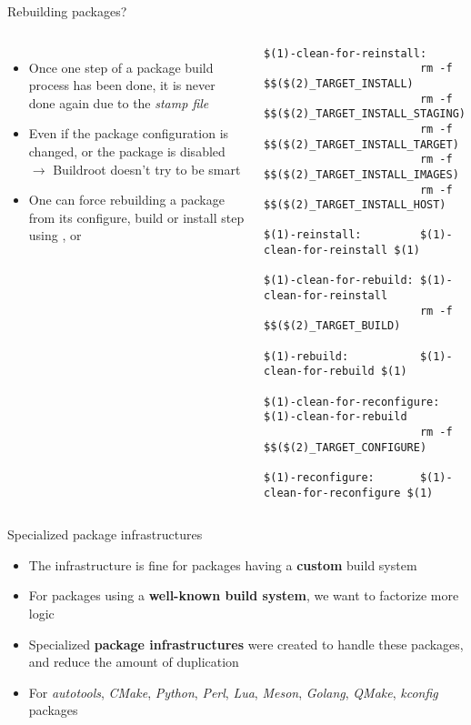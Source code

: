\begin{frame}[fragile]{Rebuilding packages?}
  \begin{columns}
  \begin{itemize}
  \item Once one step of a package build process has been done, it is
    never done again due to the {\em stamp file}
  \item Even if the package configuration is changed, or the package
    is disabled $\rightarrow$ Buildroot doesn't try to be smart
  \item One can force rebuilding a package from its configure, build
    or install step using ,
     or 
  \end{itemize}
  \begin{block}{}
\begin{verbatim}
$(1)-clean-for-reinstall:
                        rm -f $$($(2)_TARGET_INSTALL)
                        rm -f $$($(2)_TARGET_INSTALL_STAGING)
                        rm -f $$($(2)_TARGET_INSTALL_TARGET)
                        rm -f $$($(2)_TARGET_INSTALL_IMAGES)
                        rm -f $$($(2)_TARGET_INSTALL_HOST)

$(1)-reinstall:         $(1)-clean-for-reinstall $(1)

$(1)-clean-for-rebuild: $(1)-clean-for-reinstall
                        rm -f $$($(2)_TARGET_BUILD)

$(1)-rebuild:           $(1)-clean-for-rebuild $(1)

$(1)-clean-for-reconfigure: $(1)-clean-for-rebuild
                        rm -f $$($(2)_TARGET_CONFIGURE)

$(1)-reconfigure:       $(1)-clean-for-reconfigure $(1)
\end{verbatim}
  \end{block}
  \end{columns}
\end{frame}

\begin{frame}{Specialized package infrastructures}
  \begin{itemize}
  \item The  infrastructure is fine for packages
    having a {\bf custom} build system
  \item For packages using a {\bf well-known build system}, we want
    to factorize more logic
  \item Specialized {\bf package infrastructures} were created to
    handle these packages, and reduce the amount of duplication
  \item For {\em autotools}, {\em CMake}, {\em Python}, {\em Perl},
    {\em Lua}, {\em Meson}, {\em Golang}, {\em QMake}, {\em kconfig}
    packages
  \end{itemize}
\end{frame}

